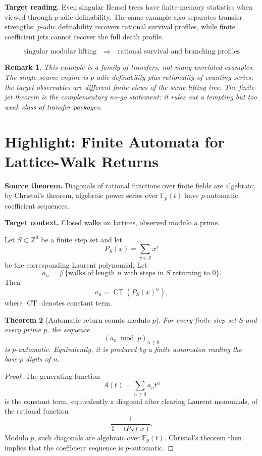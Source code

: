 \documentclass[11pt]{article}
\newtheorem{theorem}{Theorem}[section]
\newtheorem{remark}[theorem]{Remark}
\DeclareMathOperator{\CT}{CT}
\begin{document}
\textbf{Target reading.}
Even singular Hensel trees have finite-memory statistics when viewed through \(p\)-adic definability. The same example also separates transfer strengths: \(p\)-adic definability recovers rational survival profiles, while finite coefficient jets cannot recover the full death profile.

\[
\boxed{
\text{singular modular lifting}
\quad\Longrightarrow\quad
\text{rational survival and branching profiles}
}
\]

\begin{remark}
This example is a family of transfers, not many unrelated examples. The single source engine is \(p\)-adic definability plus rationality of counting series; the target observables are different finite views of the same lifting tree. The finite-jet theorem is the complementary no-go statement: it rules out a tempting but too weak class of transfer packages.
\end{remark}

\section{Highlight: Finite Automata for Lattice-Walk Returns}

\textbf{Source theorem.}
Diagonals of rational functions over finite fields are algebraic; by Christol's theorem, algebraic power series over \(\mathbb F_p(t)\) have \(p\)-automatic coefficient sequences.

\textbf{Target context.}
Closed walks on lattices, observed modulo a prime.

Let \(S\subset\mathbb Z^d\) be a finite step set and let
\[
P_S(x)=\sum_{v\in S}x^v
\]
be the corresponding Laurent polynomial. Let
\[
a_n=\#\{\text{walks of length }n\text{ with steps in }S\text{ returning to }0\}.
\]
Then
\[
a_n=\CT(P_S(x)^n),
\]
where \(\CT\) denotes constant term.

\begin{theorem}[Automatic return counts modulo \(p\)]
For every finite step set \(S\) and every prime \(p\), the sequence
\[
(a_n\bmod p)_{n\geq0}
\]
is \(p\)-automatic. Equivalently, it is produced by a finite automaton reading the base-\(p\) digits of \(n\).
\end{theorem}

\begin{proof}
The generating function
\[
A(t)=\sum_{n\geq0}a_nt^n
\]
is the constant term, equivalently a diagonal after clearing Laurent monomials, of the rational function
\[
\frac{1}{1-tP_S(x)}.
\]
Modulo \(p\), such diagonals are algebraic over \(\mathbb F_p(t)\). Christol's theorem then implies that the coefficient sequence is \(p\)-automatic.
\end{proof}
\end{document}

